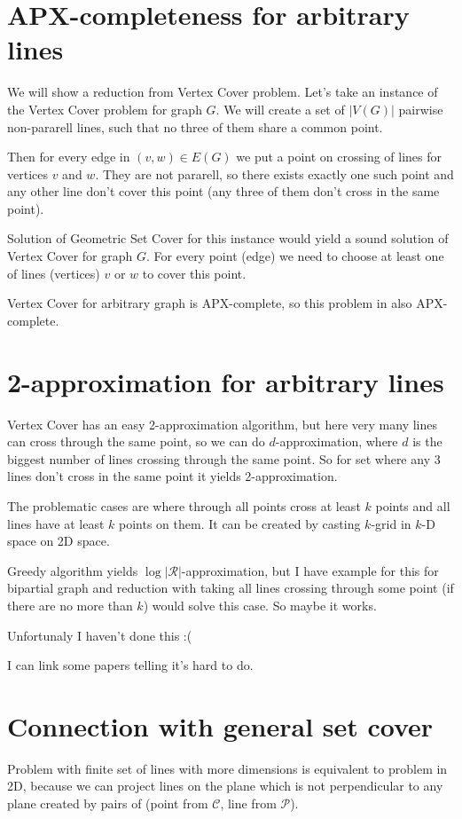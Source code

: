 \documentclass[en]{pracamgr}
\begin{document}
\section{APX-completeness for arbitrary lines}
We will show a reduction from Vertex Cover problem.
Let's take an instance of the Vertex Cover problem for graph $G$.
We will create a set of $|V(G)|$ pairwise non-pararell lines,
such that no three of them share a common point.

Then for every edge in $(v, w) \in E(G)$
we put a point on crossing of lines for vertices $v$ and $w$.
They are not pararell, so there exists exactly one such point
and any other line don't cover this point (any three of them don't
cross in the same point).

Solution of Geometric Set Cover for this instance would yield
a sound solution of Vertex Cover for graph $G$.
For every point (edge) we need to choose at least one of
lines (vertices) $v$ or $w$ to cover this point.

Vertex Cover for arbitrary graph is APX-complete,
so this problem in also APX-complete.

\section{2-approximation for arbitrary lines}
Vertex Cover has an easy 2-approximation algorithm,
but here very many lines can cross through
the same point, so we can do $d$-approximation,
where $d$ is the biggest number of lines crossing through the same point.
So for set where any 3 lines don't cross in the same point
it yields 2-approximation.

The problematic cases are where through all points
cross at least $k$ points and all lines have at least $k$ points on them.
It can be created by casting $k$-grid in $k$-D space on 2D space.

Greedy algorithm yields $\log |\mathcal{R}|$-approximation,
but I have example for this for bipartial graph and
reduction with taking all lines crossing through some point
(if there are no more than $k$) would solve this case.
So maybe it works.

Unfortunaly I haven't done this :(

I can link some papers telling it's hard to do.

\section{Connection with general set cover}
Problem with finite set of lines with more dimensions
is equivalent
to problem in 2D, because we can project
lines on the plane which is not perpendicular
to any plane created by pairs of
(point from $\mathcal{C}$, line from $\mathcal{P}$).
\end{document}
